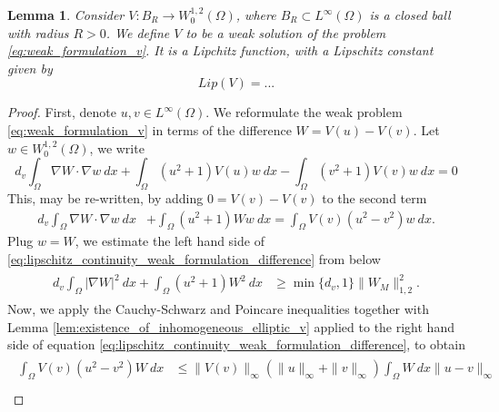 \documentclass[12pt, a4paper]{article}
\theoremstyle{break}
\theoremstyle{break}
\theoremstyle{break}
\theoremstyle{break}
\theoremstyle{break}
\newtheorem{lem}{Lemma}[section]
\theoremstyle{break}
\theoremstyle{break}
\begin{document}
\begin{lem}
    \label{lem:stationary_v_lipschitz_constant}
    Consider $V : B_R \rightarrow W^{1,2}_0(\Omega)$, where $B_R \subset L^\infty(\Omega)$ is a closed ball with radius $R > 0$. We define $V$ to be a weak solution of the problem \eqref{eq:weak_formulation_v}. It is a Lipchitz function, with a Lipschitz constant given by
    \begin{equation}
        Lip(V) = ...
    \end{equation}
\end{lem}

\begin{proof}
    First, denote $u, v \in L^\infty(\Omega)$. We reformulate the weak problem \eqref{eq:weak_formulation_v} in terms of the difference $W = V(u) - V(v)$. Let $w \in W^{1,2}_0(\Omega)$, we write
    \begin{equation*}
        d_v \int_\Omega \nabla W \cdot \nabla w \:dx + \int_\Omega (u^2 + 1) V(u) w \:dx - \int_\Omega (v^2 + 1) V(v) w \:dx = 0
    \end{equation*}
    This, may be re-written, by adding $0 = V(v) - V(v)$ to the second term
    \begin{align}
        \label{eq:lipschitz_continuity_weak_formulation_difference}
        d_v \int_\Omega \nabla W \cdot \nabla w \:dx &+ \int_\Omega (u^2 + 1) W w \:dx = \int_\Omega V(v) (u^2 - v^2) w \:dx.
    \end{align}
    Plug $w = W$, we estimate the left hand side of \eqref{eq:lipschitz_continuity_weak_formulation_difference} from below
    \begin{align}
        \label{eq:ineaulity_lhs_lipschitz_cont}
        \begin{split}
            d_v \int_\Omega |\nabla W|^2\:dx + \int_\Omega (u^2 + 1) W^2 \:dx
            &\geq
            \min\{d_v, 1\} \| W_M \|_{1, 2}^2.
        \end{split}
    \end{align}
    Now, we apply the Cauchy-Schwarz and Poincare inequalities together with Lemma \ref{lem:existence_of_inhomogeneous_elliptic_v} applied to the right hand side of equation \eqref{eq:lipschitz_continuity_weak_formulation_difference}, to obtain
    \begin{align}
        \label{eq:ineaulity_rhs_lipschitz_cont}
        \begin{split}
            \int_\Omega V(v) \left( u^2 - v^2 \right) W  \:dx 
            &\leq
            \|V(v)\|_\infty (\|u\|_\infty + \|v\|_\infty) \int_\Omega W\:dx \|u-v\|_\infty\\

\end{split}
\end{align}
\end{proof}
\end{document}
